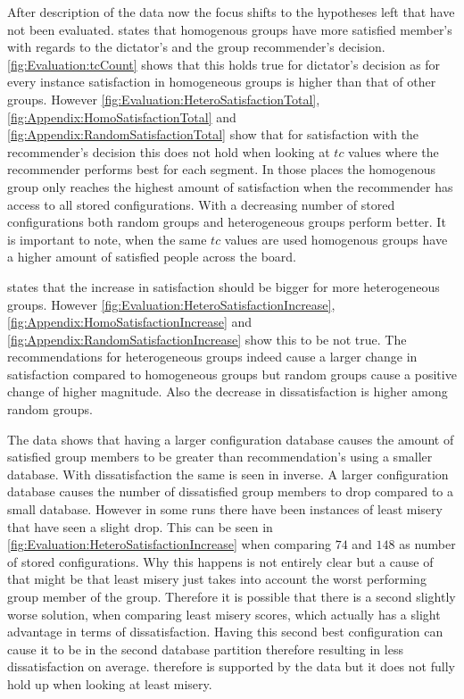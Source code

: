 After description of the data now the focus shifts to the hypotheses left that have not been evaluated.
 states that homogenous groups have more satisfied member's with regards to the dictator's and the group recommender's decision. \autoref{fig:Evaluation:tcCount} shows that this holds true for dictator's decision as for every instance satisfaction in homogeneous groups is higher than that of other groups. However \autoref{fig:Evaluation:HeteroSatisfactionTotal}, \autoref{fig:Appendix:HomoSatisfactionTotal} and \autoref{fig:Appendix:RandomSatisfactionTotal} show that for satisfaction with the recommender's decision this does not hold when looking at $tc$ values where the recommender performs best for each  segment. In those places the homogenous group only reaches the highest amount of satisfaction when the recommender has access to all stored configurations. With a decreasing number of stored configurations both random groups and heterogeneous groups perform better. It is important to note, when the same $tc$ values are used homogenous groups have a higher amount of satisfied people across the board.

 states that the increase in satisfaction should be bigger for more heterogeneous groups. However \autoref{fig:Evaluation:HeteroSatisfactionIncrease}, \autoref{fig:Appendix:HomoSatisfactionIncrease} and \autoref{fig:Appendix:RandomSatisfactionIncrease} show this to be not true. The recommendations for heterogeneous groups indeed cause a larger change in satisfaction compared to homogeneous groups but random groups cause a positive change of higher magnitude. Also the decrease in dissatisfaction is higher among random groups.

The data shows that having a larger configuration database causes the amount of satisfied group members to be greater than recommendation's using a smaller database. With dissatisfaction the same is seen in inverse. A larger configuration database causes the number of dissatisfied group members to drop compared to a small database. However in some runs there have been instances of least misery that have seen a slight drop. This can be seen in \autoref{fig:Evaluation:HeteroSatisfactionIncrease} when comparing $74$ and $148$ as number of stored configurations. Why this happens is not entirely clear but a cause of that might be that least misery just takes into account the worst performing group member of the group. Therefore it is possible that there is a second slightly worse solution, when comparing least misery scores, which actually has a slight advantage in terms of dissatisfaction. Having this second best configuration can cause it to be in the second database partition therefore resulting in less dissatisfaction on average.  therefore is supported by the data but it does not fully hold up when looking at least misery.

